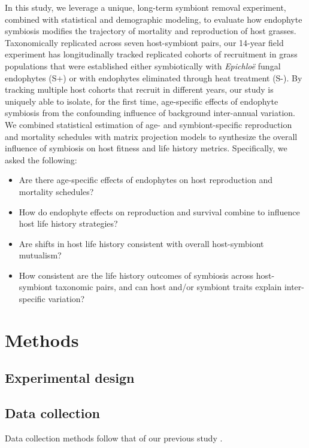 \documentclass[11pt]{article}
\begin{document}
In this study, we leverage a unique, long-term symbiont removal experiment, combined with statistical and demographic modeling, to evaluate how endophyte symbiosis modifies the trajectory of mortality and reproduction of host grasses. 
Taxonomically replicated across seven host-symbiont pairs, our 14-year field experiment has longitudinally tracked replicated cohorts of recruitment in grass populations that were established either symbiotically with \textit{Epichlo\"{e}} fungal endophytes (S+) or with endophytes eliminated through heat treatment (S-). 
By tracking multiple host cohorts that recruit in different years, our study is uniquely able to isolate, for the first time, age-specific effects of endophyte symbiosis from the confounding influence of background inter-annual variation. 
We combined statistical estimation of age- and symbiont-specific reproduction and mortality schedules with matrix projection models to synthesize the overall influence of symbiosis on host fitness and life history metrics. 
Specifically, we asked the following:
\begin{itemize}
	\item Are there age-specific effects of endophytes on host reproduction and mortality schedules?
	\item How do endophyte effects on reproduction and survival combine to influence host life history strategies?
	\item Are shifts in host life history consistent with overall host-symbiont mutualism?
	\item How consistent are the life history outcomes of symbiosis across host-symbiont taxonomic pairs, and can host and/or symbiont traits explain inter-specific variation?
\end{itemize}





\section*{Methods}
\subsection*{Experimental design}

\subsection*{Data collection}
Data collection methods follow that of our previous study \citep{fowler2024microbial}. 
\end{document}
